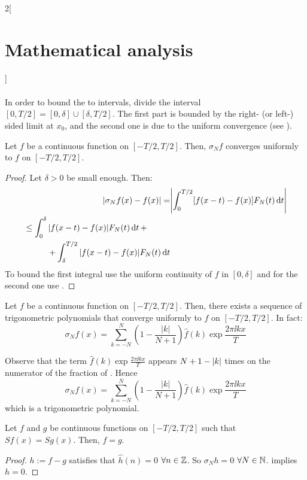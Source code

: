 \documentclass[../../../main_math.tex]{subfiles}
\begin{document}
\begin{multicols}{2}[\section{Mathematical analysis}]
\begin{sproof}
\begin{multline*}
    \end{multline*}
    In order to bound the to intervals, divide the interval $[0,T/2]=[0,\delta]\cup[\delta,T/2]$. The first part is bounded by the right- (or left-) sided limit at $x_0$, and the second one is due to the uniform convergence (see ).
  \end{sproof}
  \begin{theorem}\label{MA:fejerthm}
    Let $f$ be a continuous function on $[-T/2,T/2]$. Then, $\sigma_Nf$ converges uniformly to $f$ on $[-T/2,T/2]$.
  \end{theorem}
  \begin{proof}
    Let $\delta>0$ be small enough. Then:
    \begin{align*}
      \abs{\sigma_Nf(x)-f(x)}= & \abs{\int_0^{T/2}[f(x-t)-f(x)]F_N(t)\dd{t}} \\
      \begin{split}
         & \leq \int_0^{\delta}\abs{f(x-t)-f(x)}F_N(t)\dd{t}+          \\
         & \hspace{1cm}+\int_\delta^{T/2}\abs{f(x-t)-f(x)}F_N(t)\dd{t}
      \end{split}
    \end{align*}
    To bound the first integral use the uniform continuity of $f$ in $[0,\delta]$ and for the second one use .
  \end{proof}
  \begin{corollary}
    Let $f$ be a continuous function on $[-T/2,T/2]$. Then, there exists a sequence of trigonometric polynomials that converge uniformly to $f$ on $[-T/2,T/2]$. In fact: $$\sigma_Nf(x)=\sum_{k=-N}^N\left(1-\frac{|k|}{N+1}\right)\widehat{f}(k)\exp{\frac{2\pi\ii kx}{T}}$$
  \end{corollary}
  \begin{sproof}
    Observe that the term $\widehat{f}(k)\exp{\frac{2\pi \ii k x}{T}}$ appears $N+1 - \abs{k}$ times on the numerator of the fraction of . Hence
    $$\sigma_Nf(x)=\sum_{k=-N}^N\left(1-\frac{|k|}{N+1}\right)\widehat{f}(k)\exp{\frac{2\pi\ii kx}{T}}$$
    which is a trigonometric polynomial.
  \end{sproof}
  \begin{corollary}
    Let $f$ and $g$ be continuous functions on $[-T/2,T/2]$ such that $Sf(x)=Sg(x)$. Then, $f=g$.
  \end{corollary}
  \begin{proof}
    $h:=f-g$ satisfies that $\widehat{h}(n)=0$ $\forall n\in\mathbb{Z}$. So $\sigma_Nh=0$ $\forall N\in\mathbb{N}$.  implies $h=0$.
  \end{proof}

\end{multicols}
\end{document}
